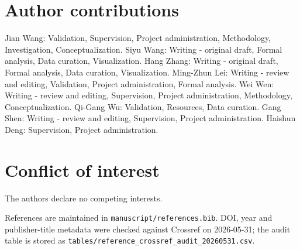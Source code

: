 \documentclass[10pt,twocolumn]{article}
\begin{document}
\section{Author contributions}

Jian Wang: Validation, Supervision, Project administration, Methodology, Investigation, Conceptualization. Siyu Wang: Writing - original draft, Formal analysis, Data curation, Visualization. Hang Zhang: Writing - original draft, Formal analysis, Data curation, Visualization. Ming-Zhun Lei: Writing - review and editing, Validation, Project administration, Formal analysis. Wei Wen: Writing - review and editing, Supervision, Project administration, Methodology, Conceptualization. Qi-Gang Wu: Validation, Resources, Data curation. Gang Shen: Writing - review and editing, Supervision, Project administration. Haishun Deng: Supervision, Project administration.


\section{Conflict of interest}

The authors declare no competing interests.



References are maintained in \texttt{manuscript/references.bib}. DOI, year and publisher-title metadata were checked against Crossref on 2026-05-31; the audit table is stored as \texttt{tables/reference\_crossref\_audit\_20260531.csv}.




\end{document}
